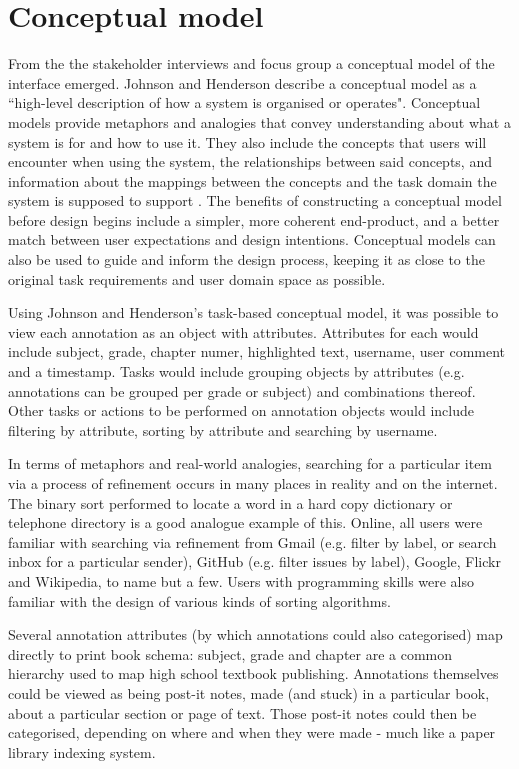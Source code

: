 \section{Conceptual model}
From the the stakeholder interviews and focus group a conceptual model of the interface emerged. Johnson and Henderson \citep[p. 27]{Johnson} describe a conceptual model as a ``high-level description of how a system is organised or operates". Conceptual models provide metaphors and analogies that convey understanding about what a system is for and how to use it. They also include the concepts that users will encounter when using the system, the relationships between said concepts, and information about the mappings between the concepts and the task domain the system is supposed to support \citep[p. 40-41]{RogersPreece}.  The benefits of constructing a conceptual model before design begins include a simpler, more coherent end-product, and a better match between user expectations and design intentions\citep[p. 26]{Johnson}. Conceptual models can also be used to guide and inform the design process, keeping it as close to the original task requirements and user domain space as possible\citep[p. 40]{RogersPreece}. 

Using Johnson and Henderson's task-based conceptual model\citep[p. 30]{Johnson}, it was possible to view each annotation as an object with attributes. Attributes for each would include subject, grade, chapter numer, highlighted text, username, user comment and a timestamp. Tasks would include grouping objects by attributes (e.g. annotations can be grouped per grade or subject) and combinations thereof. Other tasks or actions to be performed on annotation objects would include filtering by attribute, sorting by attribute and searching by username. 

In terms of metaphors and real-world analogies, searching for a particular item via a process of refinement occurs in many places in reality and on the internet. The binary sort performed to locate a word in a hard copy dictionary or telephone directory is a good analogue example of this. Online, all users were familiar with searching via refinement from Gmail (e.g. filter by label, or search inbox for a particular sender), GitHub (e.g. filter issues by label), Google, Flickr and Wikipedia, to name but a few. Users with programming skills were also familiar with the design of various kinds of sorting algorithms. 

Several annotation attributes (by which annotations could also categorised) map directly to print book schema: subject, grade and chapter are a common hierarchy used to map high school textbook publishing. Annotations themselves could be viewed as being post-it notes, made (and stuck) in a particular book, about a particular section or page of text. Those post-it notes could then be categorised, depending on where and when they were made - much like a paper library indexing system. 

